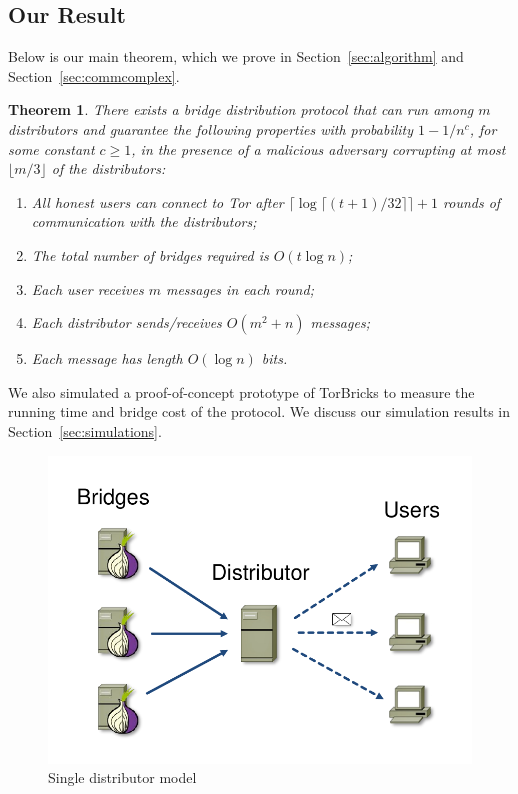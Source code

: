 \documentclass[letterpaper,twocolumn,10pt]{article}
\newcommand{\todo}[1]{{\leavevmode\color{blue}[TODO: #1]}}
\newtheorem{theorem}{Theorem}
\newcommand{\bricks}{}
\def\bricks/{\mbox{TorBricks}}
\begin{document}
\subsection{Our Result} \label{sec:results}
\noindent Below is our main theorem, which we prove in Section~\ref{sec:algorithm} and Section~\ref{sec:commcomplex}.
\begin{theorem}
	\label{thm:main} There exists a bridge distribution protocol that can run among $m$ distributors and guarantee the following properties with probability ${1 - 1/n^c}$, for some constant ${c \geq 1}$, in the presence of a malicious adversary corrupting at most $\lfloor m/3 \rfloor$ of the distributors: %
	\begin{enumerate}[itemsep=0.4em,topsep=0.5em]
		\item All honest users can connect to Tor after ${\lceil \log{\lceil (t+1)/32 \rceil} \rceil + 1}$ rounds of communication with the distributors;
		\item The total number of bridges required is $O(t\log{n})$;
		\item Each user receives $m$ messages in each round;
		\item Each distributor sends/receives $O(m^2 + n)$ messages;
		\item Each message has length $O(\log{n})$ bits.
	\end{enumerate}
\end{theorem}

We also simulated a proof-of-concept prototype of \bricks/ to measure the running time and bridge cost of the protocol. We discuss our simulation results in Section~\ref{sec:simulations}.

\begin{figure}[t]
	\centering
	\includegraphics[width=0.4\linewidth]{images/single-alg}
	\caption{Single distributor model}
	\label{fig:singledist}
\end{figure}

\end{document}
